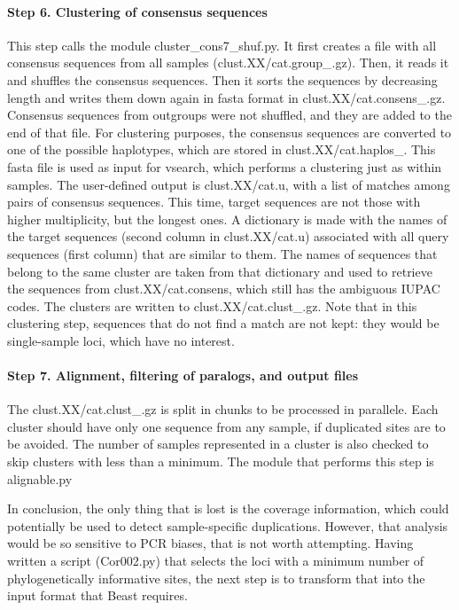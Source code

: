 \documentclass[a4paper,12pt,twosided]{article}
\begin{document}
\paragraph{Step 6. Clustering of consensus sequences}
This step calls the module cluster\_cons7\_shuf.py. It first creates a file with all consensus sequences from all samples (clust.XX/cat.group\_.gz). Then, it reads it and shuffles the consensus sequences. Then it sorts the sequences by decreasing length and writes them down again in fasta format in clust.XX/cat.consens\_.gz. Consensus sequences from outgroups were not shuffled, and they are added to the end of that file. For clustering purposes, the consensus sequences are converted to one of the possible haplotypes, which are stored in clust.XX/cat.haplos\_. This fasta file is used as input for vsearch, which performs a clustering just as within samples. The user-defined output is clust.XX/cat.u, with a list of matches among pairs of consensus sequences. This time, target sequences are not those with higher multiplicity, but the longest ones. A dictionary is made with the names of the target sequences (second column in clust.XX/cat.u) associated with all query sequences (first column) that are similar to them. The names of sequences that belong to the same cluster are taken from that dictionary and used to retrieve the sequences from clust.XX/cat.consens, which still has the ambiguous IUPAC codes. The clusters are written to clust.XX/cat.clust\_.gz. Note that in this clustering step, sequences that do not find a match are not kept: they would be single-sample loci, which have no interest.

\paragraph{Step 7. Alignment, filtering of paralogs, and output files}
The clust.XX/cat.clust\_.gz is split in chunks to be processed in parallele. Each cluster should have only one sequence from any sample, if duplicated sites are to be avoided. The number of samples represented in a cluster is also checked to skip clusters with less than a minimum. The module that performs this step is alignable.py

In conclusion, the only thing that is lost is the coverage information, which could potentially be used to detect sample-specific duplications. However, that analysis would be so sensitive to PCR biases, that is not worth attempting. Having written a script (Cor002.py) that selects the loci with a minimum number of phylogenetically informative sites, the next step is to transform that into the input format that Beast requires.
\end{document}
